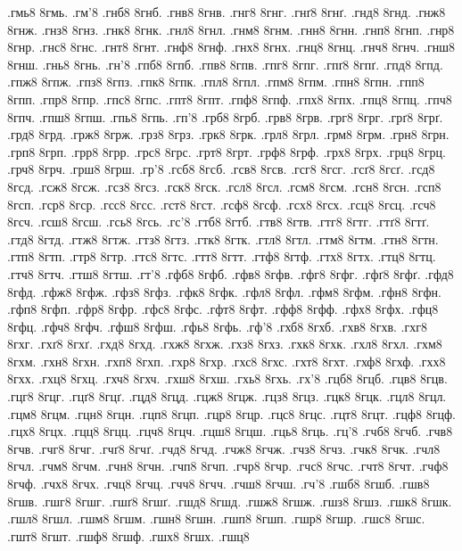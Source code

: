 {.гмь8
8гмь.
.гм'8
.гнб8
8гнб.
.гнв8
8гнв.
.гнг8
8гнг.
.гнґ8
8гнґ.
.гнд8
8гнд.
.гнж8
8гнж.
.гнз8
8гнз.
.гнк8
8гнк.
.гнл8
8гнл.
.гнм8
8гнм.
.гнн8
8гнн.
.гнп8
8гнп.
.гнр8
8гнр.
.гнс8
8гнс.
.гнт8
8гнт.
.гнф8
8гнф.
.гнх8
8гнх.
.гнц8
8гнц.
.гнч8
8гнч.
.гнш8
8гнш.
.гнь8
8гнь.
.гн'8
.гпб8
8гпб.
.гпв8
8гпв.
.гпг8
8гпг.
.гпґ8
8гпґ.
.гпд8
8гпд.
.гпж8
8гпж.
.гпз8
8гпз.
.гпк8
8гпк.
.гпл8
8гпл.
.гпм8
8гпм.
.гпн8
8гпн.
.гпп8
8гпп.
.гпр8
8гпр.
.гпс8
8гпс.
.гпт8
8гпт.
.гпф8
8гпф.
.гпх8
8гпх.
.гпц8
8гпц.
.гпч8
8гпч.
.гпш8
8гпш.
.гпь8
8гпь.
.гп'8
.грб8
8грб.
.грв8
8грв.
.грг8
8грг.
.грґ8
8грґ.
.грд8
8грд.
.грж8
8грж.
.грз8
8грз.
.грк8
8грк.
.грл8
8грл.
.грм8
8грм.
.грн8
8грн.
.грп8
8грп.
.грр8
8грр.
.грс8
8грс.
.грт8
8грт.
.грф8
8грф.
.грх8
8грх.
.грц8
8грц.
.грч8
8грч.
.грш8
8грш.
.гр'8
.гсб8
8гсб.
.гсв8
8гсв.
.гсг8
8гсг.
.гсґ8
8гсґ.
.гсд8
8гсд.
.гсж8
8гсж.
.гсз8
8гсз.
.гск8
8гск.
.гсл8
8гсл.
.гсм8
8гсм.
.гсн8
8гсн.
.гсп8
8гсп.
.гср8
8гср.
.гсс8
8гсс.
.гст8
8гст.
.гсф8
8гсф.
.гсх8
8гсх.
.гсц8
8гсц.
.гсч8
8гсч.
.гсш8
8гсш.
.гсь8
8гсь.
.гс'8
.гтб8
8гтб.
.гтв8
8гтв.
.гтг8
8гтг.
.гтґ8
8гтґ.
.гтд8
8гтд.
.гтж8
8гтж.
.гтз8
8гтз.
.гтк8
8гтк.
.гтл8
8гтл.
.гтм8
8гтм.
.гтн8
8гтн.
.гтп8
8гтп.
.гтр8
8гтр.
.гтс8
8гтс.
.гтт8
8гтт.
.гтф8
8гтф.
.гтх8
8гтх.
.гтц8
8гтц.
.гтч8
8гтч.
.гтш8
8гтш.
.гт'8
.гфб8
8гфб.
.гфв8
8гфв.
.гфг8
8гфг.
.гфґ8
8гфґ.
.гфд8
8гфд.
.гфж8
8гфж.
.гфз8
8гфз.
.гфк8
8гфк.
.гфл8
8гфл.
.гфм8
8гфм.
.гфн8
8гфн.
.гфп8
8гфп.
.гфр8
8гфр.
.гфс8
8гфс.
.гфт8
8гфт.
.гфф8
8гфф.
.гфх8
8гфх.
.гфц8
8гфц.
.гфч8
8гфч.
.гфш8
8гфш.
.гфь8
8гфь.
.гф'8
.гхб8
8гхб.
.гхв8
8гхв.
.гхг8
8гхг.
.гхґ8
8гхґ.
.гхд8
8гхд.
.гхж8
8гхж.
.гхз8
8гхз.
.гхк8
8гхк.
.гхл8
8гхл.
.гхм8
8гхм.
.гхн8
8гхн.
.гхп8
8гхп.
.гхр8
8гхр.
.гхс8
8гхс.
.гхт8
8гхт.
.гхф8
8гхф.
.гхх8
8гхх.
.гхц8
8гхц.
.гхч8
8гхч.
.гхш8
8гхш.
.гхь8
8гхь.
.гх'8
.гцб8
8гцб.
.гцв8
8гцв.
.гцг8
8гцг.
.гцґ8
8гцґ.
.гцд8
8гцд.
.гцж8
8гцж.
.гцз8
8гцз.
.гцк8
8гцк.
.гцл8
8гцл.
.гцм8
8гцм.
.гцн8
8гцн.
.гцп8
8гцп.
.гцр8
8гцр.
.гцс8
8гцс.
.гцт8
8гцт.
.гцф8
8гцф.
.гцх8
8гцх.
.гцц8
8гцц.
.гцч8
8гцч.
.гцш8
8гцш.
.гць8
8гць.
.гц'8
.гчб8
8гчб.
.гчв8
8гчв.
.гчг8
8гчг.
.гчґ8
8гчґ.
.гчд8
8гчд.
.гчж8
8гчж.
.гчз8
8гчз.
.гчк8
8гчк.
.гчл8
8гчл.
.гчм8
8гчм.
.гчн8
8гчн.
.гчп8
8гчп.
.гчр8
8гчр.
.гчс8
8гчс.
.гчт8
8гчт.
.гчф8
8гчф.
.гчх8
8гчх.
.гчц8
8гчц.
.гчч8
8гчч.
.гчш8
8гчш.
.гч'8
.гшб8
8гшб.
.гшв8
8гшв.
.гшг8
8гшг.
.гшґ8
8гшґ.
.гшд8
8гшд.
.гшж8
8гшж.
.гшз8
8гшз.
.гшк8
8гшк.
.гшл8
8гшл.
.гшм8
8гшм.
.гшн8
8гшн.
.гшп8
8гшп.
.гшр8
8гшр.
.гшс8
8гшс.
.гшт8
8гшт.
.гшф8
8гшф.
.гшх8
8гшх.
.гшц8
}
